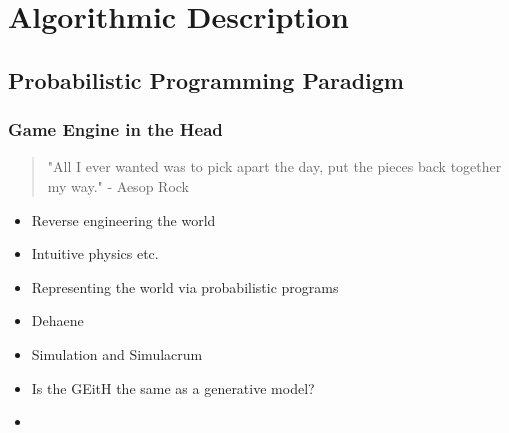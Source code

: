 \chapter{Algorithmic Description}
\section{Probabilistic Programming Paradigm}

\subsection{Game Engine in the Head}

\begin{quote}
    "All I ever wanted was to pick apart the day, put the pieces back together my way." - Aesop Rock
\end{quote}

\begin{itemize}
    \item Reverse engineering the world
    \item Intuitive physics etc. 
    \item Representing the world via probabilistic programs
    \item Dehaene
    \item Simulation and Simulacrum
    \item Is the GEitH the same as a generative model?
    \item 
\end{itemize}

